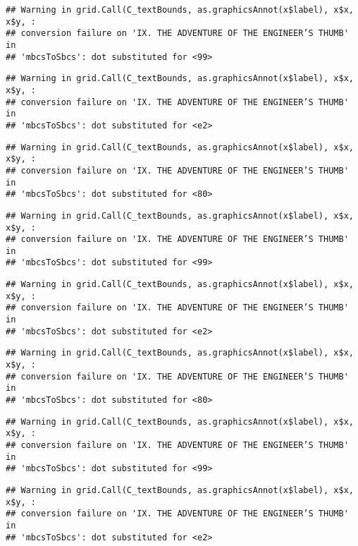 \documentclass[
]{book}
\begin{document}
\begin{verbatim}
## Warning in grid.Call(C_textBounds, as.graphicsAnnot(x$label), x$x, x$y, :
## conversion failure on 'IX. THE ADVENTURE OF THE ENGINEER’S THUMB' in
## 'mbcsToSbcs': dot substituted for <99>
\end{verbatim}

\begin{verbatim}
## Warning in grid.Call(C_textBounds, as.graphicsAnnot(x$label), x$x, x$y, :
## conversion failure on 'IX. THE ADVENTURE OF THE ENGINEER’S THUMB' in
## 'mbcsToSbcs': dot substituted for <e2>
\end{verbatim}

\begin{verbatim}
## Warning in grid.Call(C_textBounds, as.graphicsAnnot(x$label), x$x, x$y, :
## conversion failure on 'IX. THE ADVENTURE OF THE ENGINEER’S THUMB' in
## 'mbcsToSbcs': dot substituted for <80>
\end{verbatim}

\begin{verbatim}
## Warning in grid.Call(C_textBounds, as.graphicsAnnot(x$label), x$x, x$y, :
## conversion failure on 'IX. THE ADVENTURE OF THE ENGINEER’S THUMB' in
## 'mbcsToSbcs': dot substituted for <99>
\end{verbatim}

\begin{verbatim}
## Warning in grid.Call(C_textBounds, as.graphicsAnnot(x$label), x$x, x$y, :
## conversion failure on 'IX. THE ADVENTURE OF THE ENGINEER’S THUMB' in
## 'mbcsToSbcs': dot substituted for <e2>
\end{verbatim}

\begin{verbatim}
## Warning in grid.Call(C_textBounds, as.graphicsAnnot(x$label), x$x, x$y, :
## conversion failure on 'IX. THE ADVENTURE OF THE ENGINEER’S THUMB' in
## 'mbcsToSbcs': dot substituted for <80>
\end{verbatim}

\begin{verbatim}
## Warning in grid.Call(C_textBounds, as.graphicsAnnot(x$label), x$x, x$y, :
## conversion failure on 'IX. THE ADVENTURE OF THE ENGINEER’S THUMB' in
## 'mbcsToSbcs': dot substituted for <99>
\end{verbatim}

\begin{verbatim}
## Warning in grid.Call(C_textBounds, as.graphicsAnnot(x$label), x$x, x$y, :
## conversion failure on 'IX. THE ADVENTURE OF THE ENGINEER’S THUMB' in
## 'mbcsToSbcs': dot substituted for <e2>
\end{verbatim}
\end{document}
